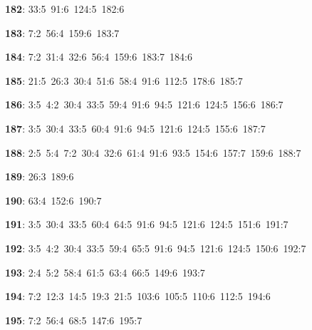 \noindent \textbf{182}: 33:5\allowbreak\ 91:6\allowbreak\ 124:5\allowbreak\ 182:6\par
\noindent \textbf{183}: 7:2\allowbreak\ 56:4\allowbreak\ 159:6\allowbreak\ 183:7\par
\noindent \textbf{184}: 7:2\allowbreak\ 31:4\allowbreak\ 32:6\allowbreak\ 56:4\allowbreak\ 159:6\allowbreak\ 183:7\allowbreak\ 184:6\par
\noindent \textbf{185}: 21:5\allowbreak\ 26:3\allowbreak\ 30:4\allowbreak\ 51:6\allowbreak\ 58:4\allowbreak\ 91:6\allowbreak\ 112:5\allowbreak\ 178:6\allowbreak\ 185:7\par
\noindent \textbf{186}: 3:5\allowbreak\ 4:2\allowbreak\ 30:4\allowbreak\ 33:5\allowbreak\ 59:4\allowbreak\ 91:6\allowbreak\ 94:5\allowbreak\ 121:6\allowbreak\ 124:5\allowbreak\ 156:6\allowbreak\ 186:7\par
\noindent \textbf{187}: 3:5\allowbreak\ 30:4\allowbreak\ 33:5\allowbreak\ 60:4\allowbreak\ 91:6\allowbreak\ 94:5\allowbreak\ 121:6\allowbreak\ 124:5\allowbreak\ 155:6\allowbreak\ 187:7\par
\noindent \textbf{188}: 2:5\allowbreak\ 5:4\allowbreak\ 7:2\allowbreak\ 30:4\allowbreak\ 32:6\allowbreak\ 61:4\allowbreak\ 91:6\allowbreak\ 93:5\allowbreak\ 154:6\allowbreak\ 157:7\allowbreak\ 159:6\allowbreak\ 188:7\par
\noindent \textbf{189}: 26:3\allowbreak\ 189:6\par
\noindent \textbf{190}: 63:4\allowbreak\ 152:6\allowbreak\ 190:7\par
\noindent \textbf{191}: 3:5\allowbreak\ 30:4\allowbreak\ 33:5\allowbreak\ 60:4\allowbreak\ 64:5\allowbreak\ 91:6\allowbreak\ 94:5\allowbreak\ 121:6\allowbreak\ 124:5\allowbreak\ 151:6\allowbreak\ 191:7\par
\noindent \textbf{192}: 3:5\allowbreak\ 4:2\allowbreak\ 30:4\allowbreak\ 33:5\allowbreak\ 59:4\allowbreak\ 65:5\allowbreak\ 91:6\allowbreak\ 94:5\allowbreak\ 121:6\allowbreak\ 124:5\allowbreak\ 150:6\allowbreak\ 192:7\par
\noindent \textbf{193}: 2:4\allowbreak\ 5:2\allowbreak\ 58:4\allowbreak\ 61:5\allowbreak\ 63:4\allowbreak\ 66:5\allowbreak\ 149:6\allowbreak\ 193:7\par
\noindent \textbf{194}: 7:2\allowbreak\ 12:3\allowbreak\ 14:5\allowbreak\ 19:3\allowbreak\ 21:5\allowbreak\ 103:6\allowbreak\ 105:5\allowbreak\ 110:6\allowbreak\ 112:5\allowbreak\ 194:6\par
\noindent \textbf{195}: 7:2\allowbreak\ 56:4\allowbreak\ 68:5\allowbreak\ 147:6\allowbreak\ 195:7\par
